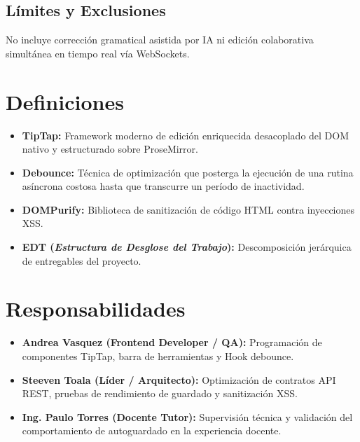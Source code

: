 \documentclass[12pt,a4paper]{article}
\begin{document}
\subsection{Límites y Exclusiones}
No incluye corrección gramatical asistida por IA ni edición colaborativa simultánea en tiempo real vía WebSockets.

\section{Definiciones}
\begin{itemize}[leftmargin=1.5em, itemsep=2pt, topsep=2pt]
    \item \textbf{TipTap:} Framework moderno de edición enriquecida desacoplado del DOM nativo y estructurado sobre ProseMirror.
    \item \textbf{Debounce:} Técnica de optimización que posterga la ejecución de una rutina asíncrona costosa hasta que transcurre un período de inactividad.
    \item \textbf{DOMPurify:} Biblioteca de sanitización de código HTML contra inyecciones XSS.
    \item \textbf{EDT (\textit{Estructura de Desglose del Trabajo}):} Descomposición jerárquica de entregables del proyecto.
\end{itemize}

\section{Responsabilidades}
\begin{itemize}[leftmargin=1.5em, itemsep=2pt, topsep=2pt]
    \item \textbf{Andrea Vasquez (Frontend Developer / QA):} Programación de componentes TipTap, barra de herramientas y Hook debounce.
    \item \textbf{Steeven Toala (Líder / Arquitecto):} Optimización de contratos API REST, pruebas de rendimiento de guardado y sanitización XSS.
    \item \textbf{Ing. Paulo Torres (Docente Tutor):} Supervisión técnica y validación del comportamiento de autoguardado en la experiencia docente.
\end{itemize}
\end{document}
